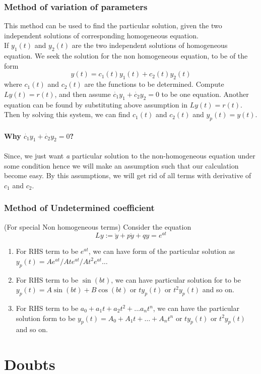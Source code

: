 \documentclass[12pt,reqno]{amsart}
\theoremstyle{plain}
\theoremstyle{definition}
\begin{document}
\subsubsection{\bf Method of variation of parameters} This method can be used to find the particular solution, given the two independent solutions of corresponding homogeneous equation.\\
If $y_1(t)$ and $y_2(t)$ are the two independent solutions of homogeneous equation. We seek the solution for the non homogeneous equation, to be of the form
$$ y(t) = c_1(t)y_1(t) + c_2(t)y_2(t) $$
where $c_1(t)$ and $c_2(t)$ are the functions to be determined. Compute $Ly(t) = r(t)$, and then assume $\dot{c_1}y_1 + \dot{c_2}y_2 = 0$ to be one equation. Another equation can be found by substituting above assumption in $Ly(t) = r(t)$. Then by solving this system, we can find $c_1(t)$ and $c_2(t)$ and $y_p(t) = y(t)$.
\paragraph{\bf Why $\dot{c_1}y_1 + \dot{c_2}y_2 = 0$?} Since, we just want {\it a} particular solution to the non-homogeneous equation under some condition hence we will make an assumption such that our calculation become easy. By this assumptions, we will get rid of all terms with derivative of $c_1$ and $c_2$.
\subsubsection{\bf Method of Undetermined coefficient}(For special Non homogeneous terms) Consider the equation 
$$ Ly := \ddot{y} + p\dot{y} + qy = e^{at}$$ 
\begin{enumerate}
    \item For RHS term to be $e^{at}$, we can have form of the particular solution as $y_p(t) = Ae^{at}/Ate^{at}/At^2e^{at} \dots$
    \item For RHS term to be $\sin(bt)$, we can have particular solution for to be $y_p(t) = A\sin(bt) + B\cos(bt)$ or $ty_p(t)$ or $t^2y_p(t)$ and so on.
    \item For RHS term to be $a_0 + a_1t + a_2t^2 + \dots a_nt^n$, we can have the particular solution form to be $y_p(t) = A_0 + A_1t + \dots + A_nt^n$ or $ty_p(t)$ or $t^2y_p(t)$ and so on.
\end{enumerate}

\section{Doubts}
\end{document}
